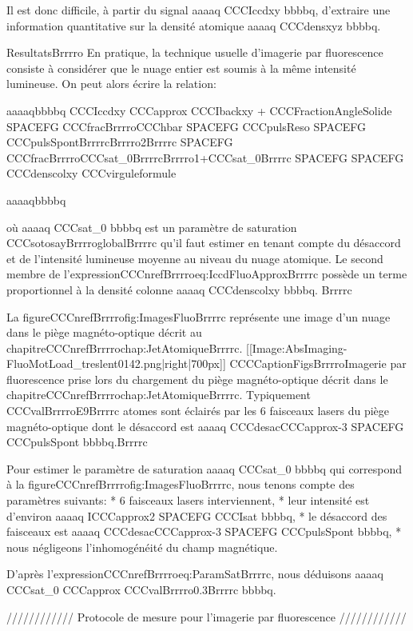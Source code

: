 Il est donc difficile, à partir du signal aaaaq CCCIccdxy bbbbq, d'extraire une information quantitative sur la densité atomique aaaaq CCCdensxyz bbbbq.




ResultatsBrrrro
En pratique, la technique usuelle d'imagerie par fluorescence consiste à considérer que le nuage entier est soumis à la même intensité lumineuse. On peut alors écrire la relation:



aaaaqbbbbq
	CCCIccdxy 
	CCCapprox  CCCIbackxy
	  + CCCFractionAngleSolide
	 SPACEFG  CCCfracBrrrroCCChbar SPACEFG CCCpulsReso SPACEFG CCCpulsSpontBrrrrcBrrrro2Brrrrc SPACEFG CCCfracBrrrroCCCsat_0BrrrrcBrrrro1+CCCsat_0Brrrrc SPACEFG 
	 SPACEFG  CCCdenscolxy
	CCCvirguleformule
	
aaaaqbbbbq


 
où aaaaq CCCsat_0 bbbbq est un paramètre de saturation CCCsotosayBrrrroglobalBrrrrc qu'il faut estimer en tenant compte du désaccord et de l'intensité lumineuse moyenne au niveau du nuage atomique.
Le second membre de l'expressionCCCnrefBrrrroeq:IccdFluoApproxBrrrrc possède un terme proportionnel à la densité colonne aaaaq CCCdenscolxy bbbbq.
Brrrrc


La figureCCCnrefBrrrrofig:ImagesFluoBrrrrc représente une image d'un nuage dans le piège magnéto-optique décrit au chapitreCCCnrefBrrrrochap:JetAtomiqueBrrrrc. 
[[Image:AbsImaging-FluoMotLoad_treslent0142.png|right|700px]]
CCCCaptionFigsBrrrroImagerie par fluorescence prise lors du chargement du piège magnéto-optique décrit dans le chapitreCCCnrefBrrrrochap:JetAtomiqueBrrrrc. Typiquement CCCvalBrrrroE9Brrrrc atomes sont éclairés par les 6 faisceaux lasers du piège magnéto-optique dont le désaccord est aaaaq CCCdesacCCCapprox-3 SPACEFG CCCpulsSpont bbbbq.Brrrrc



Pour estimer le paramètre de saturation aaaaq CCCsat_0 bbbbq qui correspond à la figureCCCnrefBrrrrofig:ImagesFluoBrrrrc, nous tenons compte des paramètres suivants:
	* 6 faisceaux lasers interviennent,	* leur intensité est d'environ aaaaq ICCCapprox2 SPACEFG CCCIsat bbbbq,
	* le désaccord des faisceaux est aaaaq CCCdesacCCCapprox-3 SPACEFG CCCpulsSpont bbbbq,
	* nous négligeons l'inhomogénéité du champ magnétique.

D'après l'expressionCCCnrefBrrrroeq:ParamSatBrrrrc, nous déduisons aaaaq CCCsat_0 CCCapprox CCCvalBrrrro0.3Brrrrc bbbbq.


//////////// Protocole de mesure pour l'imagerie par fluorescence ////////////


